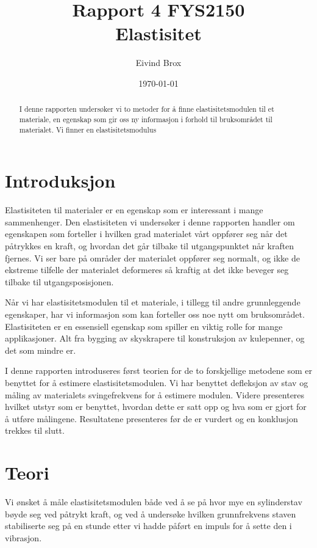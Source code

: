 \documentclass[a4paper,11pt, twocolumn]{article}
\title{Rapport 4 FYS2150\\Elastisitet}
\author{Eivind Brox}
\date{\today}
\begin{document}
\maketitle

\listoftodos

\begin{abstract}
I denne rapporten undersøker vi to metoder for å finne elastisitetsmodulen til et materiale, en egenskap som gir oss ny informasjon i forhold til bruksområdet til materialet. Vi finner en elastisitetsmodulus 

\end{abstract}

\section{Introduksjon}
Elastisiteten til materialer er en egenskap som er interessant i mange sammenhenger. Den elastisiteten vi undersøker i denne rapporten handler om egenskapen som forteller i hvilken grad materialet vårt oppfører seg når det påtrykkes en kraft, og hvordan det går tilbake til utgangspunktet når kraften fjernes. Vi ser bare på områder der materialet oppfører seg normalt, og ikke de ekstreme tilfelle der materialet deformeres så kraftig at det ikke beveger seg tilbake til utgangsposisjonen.

Når vi har elastisitetsmodulen til et materiale, i tillegg til andre grunnleggende egenskaper, har vi informasjon som kan forteller oss noe nytt om bruksområdet. Elastisiteten er en essensiell egenskap som spiller en viktig rolle for mange applikasjoner. Alt fra bygging av skyskrapere til konstruksjon av kulepenner, og det som mindre er.

I denne rapporten introduseres først teorien for de to forskjellige metodene som er benyttet for å estimere elastisitetsmodulen. Vi har benyttet defleksjon av stav og måling av materialets svingefrekvens for å estimere modulen. Videre presenteres hvilket utstyr som er benyttet, hvordan dette er satt opp og hva som er gjort for å utføre målingene. Resultatene presenteres før de er vurdert og en konklusjon trekkes til slutt. 




   
\section{Teori}
Vi ønsket å måle elastisitetsmodulen både ved å se på hvor mye en sylinderstav bøyde seg ved påtrykt kraft, og ved å undersøke hvilken grunnfrekvens staven stabiliserte seg på en stunde etter vi hadde påført en impuls for å sette den i vibrasjon.
\end{document}
